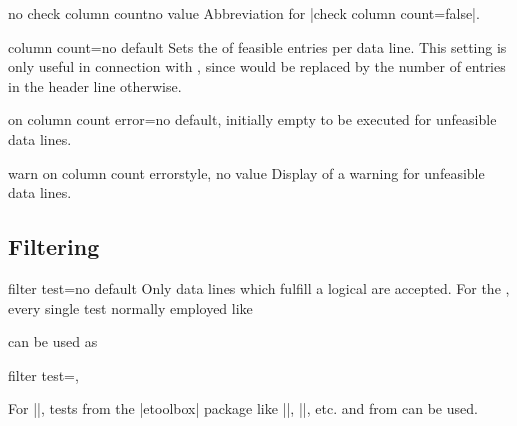\documentclass[a4paper,11pt]{ltxdoc}
\begin{document}
\begin{docCsvKey}{no check column count}{}{no value}
  Abbreviation for |check column count=false|.
\end{docCsvKey}


\begin{docCsvKey}{column count}{=}{no default}
  Sets the  of feasible entries per data line.
  This setting is only useful in connection with ,
  since  would be replaced by the number of entries in the
  header line otherwise.
\end{docCsvKey}


\begin{docCsvKey}{on column count error}{=}{no default, initially empty}
   to be executed for unfeasible data lines.
\end{docCsvKey}


\begin{docCsvKey}{warn on column count error}{}{style, no value}
  Display of a warning for unfeasible data lines.
\end{docCsvKey}


\clearpage
\subsection{Filtering}%

\begin{docCsvKey}[][doc new=2016-07-01]{filter test}{=}{no default}
  Only data lines which fulfill a logical  are accepted.
  For the , every single test normally employed like
\begin{dispListing}
\end{dispListing}
  can be used as
\begin{dispListing}
filter test=,
\end{dispListing}
  For |\iftest|, tests from the |etoolbox| package like
  |\ifnumcomp|, |\ifdimgreater|, etc. and from  can be used.

\begin{dispExample}
\end{dispExample}
\end{docCsvKey}
\end{document}
